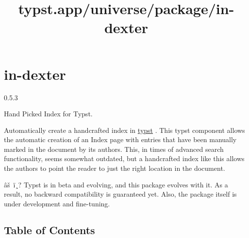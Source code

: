 \title{typst.app/universe/package/in-dexter}

\label{banner}
\section{in-dexter}\label{in-dexter}

{ 0.5.3 }

Hand Picked Index for Typst.

\label{readme}
Automatically create a handcrafted index in
\href{https://typst.app/}{typst} . This typst component allows the
automatic creation of an Index page with entries that have been manually
marked in the document by its authors. This, in times of advanced search
functionality, seems somewhat outdated, but a handcrafted index like
this allows the authors to point the reader to just the right location
in the document.

âš~ï¸? Typst is in beta and evolving, and this package evolves with it.
As a result, no backward compatibility is guaranteed yet. Also, the
package itself is under development and fine-tuning.

\subsection{Table of Contents}\label{table-of-contents}

